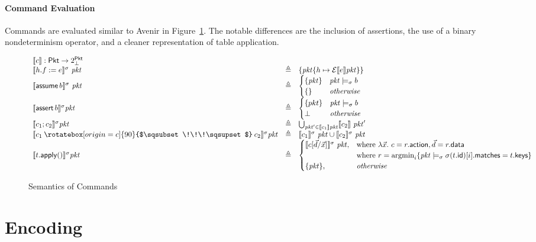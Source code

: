 \documentclass{article}
\newcommand{\pkt}{\mathit{pkt}}
\newcommand{\denote}[1]{\llbracket#1\rrbracket}
\newcommand{\edenote}[1]{\mathcal{E}\denote{#1}}
\newcommand{\Pkt}{\mathsf{Pkt}}
\newcommand{\matches}{\mathsf{matches}}
\newcommand{\action}{\mathsf{action}}
\newcommand{\keys}{\mathsf{keys}}
\newcommand{\data}{\mathsf{data}}
\newcommand{\id}{\mathsf{id}}
\newcommand{\assert}{\mathop{\mathsf{assert}}}
\newcommand{\assume}{\mathop{\mathsf{assume}}}
\newcommand{\apply}{\mathsf{apply}}
\newcommand{\choice}{\mathbin{\rotatebox[origin=c]{90}{$\sqsubset\!\!\!\sqsupset$}}}
\newcommand{\argmin}{\mathop{\textrm{argmin}}}
\begin{document}
\paragraph{Command Evaluation}
Commands are evaluated similar to Avenir in Figure~\ref{fig:com-sem}. The
notable differences are the inclusion of assertions, the use of a binary
nondeterminism operator, and a cleaner representation of table application.

\begin{figure}[htp]
  \[\begin{array}{l >{\triangleq}cl}
  \multicolumn{3}{l}{\denote{c} : \Pkt \to 2^\Pkt_\bot }\\
    \denote{h.f := e}^\sigma~\pkt && \{\pkt\{h \mapsto \edenote{e}\pkt\}\} \\
    \denote{\assume b}^\sigma~\pkt &&
    \begin{cases}
      \{\pkt\} & \pkt \models_\sigma b \\
      \{\} & \textit{otherwise} \\
    \end{cases}\\
    \denote{\assert b}^\sigma \pkt &&
    \begin{cases}
      \{pkt\} & \pkt \models_\sigma b \\
      \bot & \textit{otherwise}
    \end{cases} \\
    \denote{c_1;c_2}^\sigma \pkt&&
    \bigcup_{\pkt' \in \denote{c_1}\pkt}\denote{c_2}~\pkt' \\
    \denote{c_1 \choice c_2}^\sigma \pkt &&
    \denote{c_1}^\sigma~\pkt \cup \denote{c_2}^\sigma~\pkt \\
    \denote{t.\apply()}^\sigma \pkt &&
    \begin{cases}
      \denote{c[\vec d/\vec x]}^\sigma~\pkt,
      & \text{where}~\lambda \vec x.~c = r.\action, \vec d = r.\data \\
      & \text{where}~r = \argmin_i\{\pkt \models_\sigma \sigma(t.\id)[i].\matches = t.\keys \} \\

      \{\pkt\}, & \mathit{otherwise}
    \end{cases}

  \end{array}\]
  \caption{Semantics of Commands}
  \label{fig:com-sem}
\end{figure}


\section{Encoding}
\end{document}
